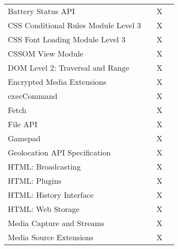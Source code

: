 \begin{table}[th]
{\begin{tabular}{ l | c c c }
          Battery Status API                            &   & X \\ %
          CSS Conditional Rules Module Level 3          &   & X \\ %
          CSS Font Loading Module Level 3               &   & X \\ %
          CSSOM View Module                             &   & X \\ %
          DOM Level 2: Traversal and Range              &   & X \\ %
          Encrypted Media Extensions                    &   & X \\ %
          execCommand                                   &   & X \\ %
          Fetch                                         &   & X \\ %
          File API                                      &   & X \\ %
          Gamepad                                       &   & X \\ %
          Geolocation API Specification                 &   & X \\ %
          HTML: Broadcasting                            &   & X \\ %
          HTML: Plugins                                 &   & X \\ %
          HTML: History Interface                       &   & X \\ %
          HTML: Web Storage                             &   & X \\ %
          Media Capture and Streams                     &   & X \\ %
          Media Source Extensions                       &   & X \\ %

\end{tabular}}
\end{table}
